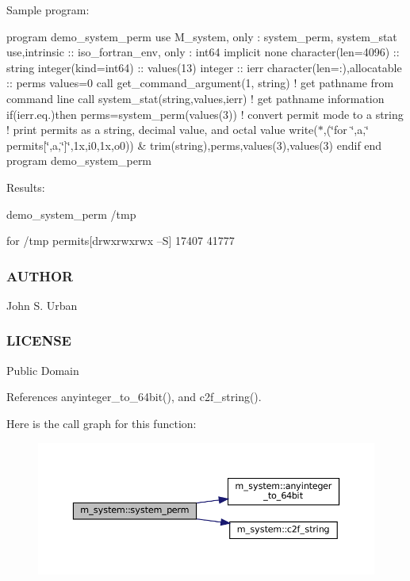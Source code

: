 Sample program\+:

program demo\+\_\+system\+\_\+perm use M\+\_\+system, only \+: system\+\_\+perm, system\+\_\+stat use,intrinsic \+:\+: iso\+\_\+fortran\+\_\+env, only \+: int64 implicit none character(len=4096) \+:\+: string integer(kind=int64) \+:\+: values(13) integer \+:\+: ierr character(len=\+:),allocatable \+:\+: perms values=0 call get\+\_\+command\+\_\+argument(1, string) ! get pathname from command line call system\+\_\+stat(string,values,ierr) ! get pathname information if(ierr.\+eq.)then perms=system\+\_\+perm(values(3)) ! convert permit mode to a string ! print permits as a string, decimal value, and octal value write($\ast$,\textquotesingle{}(\char`\"{}for \char`\"{},a,\char`\"{} permits\mbox{[}\char`\"{},a,\char`\"{}\mbox{]}\char`\"{},1x,i0,1x,o0)\textquotesingle{}) \& trim(string),perms,values(3),values(3) endif end program demo\+\_\+system\+\_\+perm

Results\+:

demo\+\_\+system\+\_\+perm /tmp

for /tmp permits\mbox{[}drwxrwxrwx --S\mbox{]} 17407 41777

\subsubsection*{A\+U\+T\+H\+OR}

John S. Urban \subsubsection*{L\+I\+C\+E\+N\+SE}

Public Domain 

References anyinteger\+\_\+to\+\_\+64bit(), and c2f\+\_\+string().

Here is the call graph for this function\+:
\nopagebreak
\begin{figure}[H]
\begin{center}
\leavevmode
\includegraphics[width=350pt]{namespacem__system_ae8f39e1d4e420396319105e4e81f92b5_cgraph}
\end{center}
\end{figure}
\mbox{\label{namespacem__system_afae451a1fc5432274dc1f75a364051b4}} 
